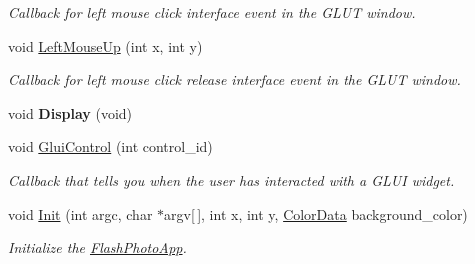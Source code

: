 \begin{DoxyCompactItemize}
\begin{DoxyCompactList}\small\item\em Callback for left mouse click interface event in the G\+L\+UT window. \end{DoxyCompactList}\item 
void \hyperlink{classimage__tools_1_1FlashPhotoApp_ab2fb593952915731ec50da0a4a20d097}{Left\+Mouse\+Up} (int x, int y)\hypertarget{classimage__tools_1_1FlashPhotoApp_ab2fb593952915731ec50da0a4a20d097}{}\label{classimage__tools_1_1FlashPhotoApp_ab2fb593952915731ec50da0a4a20d097}

\begin{DoxyCompactList}\small\item\em Callback for left mouse click release interface event in the G\+L\+UT window. \end{DoxyCompactList}\item 
void {\bfseries Display} (void)\hypertarget{classimage__tools_1_1FlashPhotoApp_a3ee0b08c0e7096652ef8dc549a684f76}{}\label{classimage__tools_1_1FlashPhotoApp_a3ee0b08c0e7096652ef8dc549a684f76}

\item 
void \hyperlink{classimage__tools_1_1FlashPhotoApp_a1cfe5fd1baf32a23264a6eff88987baf}{Glui\+Control} (int control\+\_\+id)\hypertarget{classimage__tools_1_1FlashPhotoApp_a1cfe5fd1baf32a23264a6eff88987baf}{}\label{classimage__tools_1_1FlashPhotoApp_a1cfe5fd1baf32a23264a6eff88987baf}

\begin{DoxyCompactList}\small\item\em Callback that tells you when the user has interacted with a G\+L\+UI widget. \end{DoxyCompactList}\item 
void \hyperlink{classimage__tools_1_1FlashPhotoApp_a1bf24fa1a123732fe5d5e1964974dec1}{Init} (int argc, char $\ast$argv\mbox{[}$\,$\mbox{]}, int x, int y, \hyperlink{classimage__tools_1_1ColorData}{Color\+Data} background\+\_\+color)
\begin{DoxyCompactList}\small\item\em Initialize the \hyperlink{classimage__tools_1_1FlashPhotoApp}{Flash\+Photo\+App}. \end{DoxyCompactList}\end{DoxyCompactItemize}
